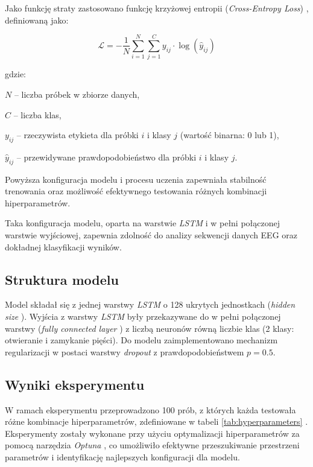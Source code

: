\documentclass[eeg_v4.tex]{subfiles}
\begin{document}
    Jako funkcję straty zastosowano funkcję krzyżowej entropii (\textit{Cross-Entropy Loss})
    \cite{pytorch2025crossentropy}, definiowaną jako:

    \[
        \mathcal{L} = -\frac{1}{N} \sum_{i=1}^{N} \sum_{j=1}^{C} y_{ij} \cdot \log (\hat{y}_{ij})
    \]

    gdzie:

    \begin{description}
        \item \( N \) – liczba próbek w zbiorze danych,
        \item \( C \) – liczba klas,
        \item \( y_{ij} \) – rzeczywista etykieta dla próbki \( i \) i klasy \( j \) (wartość binarna: 0 lub 1),
        \item \( \hat{y}_{ij} \) – przewidywane prawdopodobieństwo dla próbki \( i \) i klasy \( j \).
    \end{description}

    Powyższa konfiguracja modelu i procesu uczenia zapewniała stabilność trenowania oraz możliwość efektywnego
    testowania różnych kombinacji hiperparametrów.

    Taka konfiguracja modelu, oparta na warstwie \textit{LSTM}
    i w pełni połączonej warstwie wyjściowej, zapewnia zdolność do analizy sekwencji danych EEG oraz dokładnej
    klasyfikacji wyników.

    \subsection{Struktura modelu}
    Model składał się z jednej warstwy \textit{LSTM} o 128 ukrytych jednostkach (\textit{hidden size}
    ). Wyjścia z warstwy \textit{LSTM} były przekazywane do w pełni połączonej warstwy (\textit{fully connected layer}
    ) z liczbą neuronów równą liczbie klas (2 klasy: otwieranie i zamykanie pięści). Do modelu zaimplementowano
    mechanizm regularizacji w postaci warstwy \textit{dropout} z prawdopodobieństwem $p=0.5$.

    \subsection{Wyniki eksperymentu}

    W ramach eksperymentu przeprowadzono 100 prób, z których każda testowała różne kombinacje hiperparametrów,
    zdefiniowane w tabeli \ref{tab:hyperparameters}
    . Eksperymenty zostały wykonane przy użyciu optymalizacji hiperparametrów za pomocą narzędzia \textit{Optuna}
    , co umożliwiło efektywne przeszukiwanie przestrzeni parametrów i identyfikację najlepszych konfiguracji dla modelu.
\end{document}

